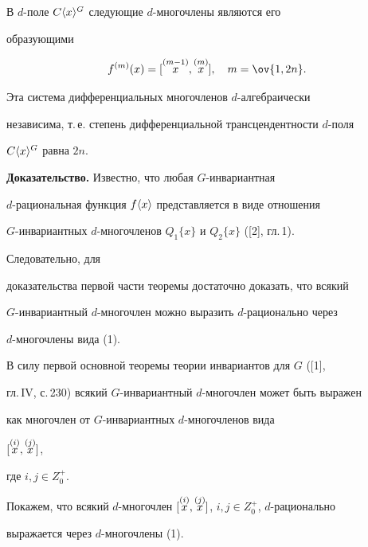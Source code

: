 \begin{thm}


В $d$-поле $C\langle x\rangle^G$ следующие $d$-многочлены являются его 


образующими


\begin{equation}


f^{(m)}(x)=[\up{(m-1)}{x},\up{(m)}{x}],\quad m=\ov{1,2n}.


\end{equation}





Эта система дифференциальных многочленов $d$-алгебраически 


независима, т.\,е. степень дифференциальной трансцендентности $d$-поля 


$C\langle x\rangle^G$ равна $2n$.


\end{thm}





{\bf Доказательство.} Известно, что любая $G$-инвариантная 


$d$-рациональная функция $f\langle x\rangle$ представляется в виде отношения


$G$-инвариантных $d$-многочленов $Q_1\{x\}$ и $Q_2\{x\}$ ([2], гл.\,1). 


Следовательно, для 


доказательства первой части теоремы достаточно доказать, что всякий


$G$-инвариантный $d$-многочлен можно выразить $d$-рационально через 


$d$-многочлены вида (1).





В силу первой основной теоремы теории инвариантов для $G$ ([1], 


гл.\,IV, с.\,230) всякий $G$-инвариантный $d$-многочлен может быть выражен 


как многочлен от $G$-инвариантных $d$-многочленов вида 


$[\overset{(i)}{x}{},\overset{(j)}{x}{}]$,


где $i,j\in Z^+_0$.





Покажем, что всякий $d$-многочлен $[\up{(i)}{x},\up{(j)}{x}]$, $i,j\in 


Z^+_0$, $d$-рационально 


выражается через $d$-многочлены (1).





